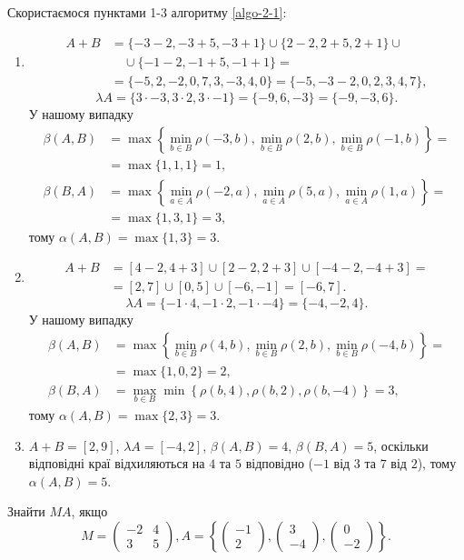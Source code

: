 \begin{solution}
	Скористаємося пунктами 1-3 алгоритму \ref{algo-2-1}:
	\begin{enumerate}
	    \item \begin{align*} A + B &= \{-3-2, -3+5, -3+1\} \cup \{2-2, 2+5, 2+1\} \cup \\
	    &\quad\cup \{-1-2, -1+5, -1+1\} =\\&= \{-5,2,-2,0,7,3,-3,4,0\}=\{-5,-3-2,0,2,3,4,7\},\end{align*}
	    \[ \lambda A = \{3 \cdot -3, 3 \cdot 2, 3 \cdot -1 \} = \{-9,6,-3\}=\{-9,-3,6\}.\]
	    У нашому випадку \begin{align*}\beta (A, B) &= \max\left\{\min_{b\in B} \rho(-3,b), \min_{b\in B} \rho(2,b), \min_{b\in B} \rho(-1,b)\right\}=\\&=\max\{1,1,1\}=1, \\ \beta (B, A) &= \max\left\{\min_{a\in A} \rho(-2,a), \min_{a\in A} \rho(5,a), \min_{a\in A} \rho(1,a)\right\}=\\&=\max\{1,3,1\}=3,\end{align*} тому $\alpha (A, B) = \max\{1,3\}=3$.
	    \item \begin{align*} A + B &= [4-2,4+3] \cup [2-2,2+3] \cup [-4-2,-4+3] = \\
	        &= [2,7] \cup [0,5] \cup [-6,-1] = [-6,7].
	    \end{align*} 
	    \[ \lambda A = \{-1 \cdot 4, -1 \cdot 2, -1 \cdot -4 \} = \{-4,-2,4\}.\]
	    У нашому випадку \begin{align*}\beta (A, B) &= \max\left\{\min_{b\in B} \rho(4,b), \min_{b\in B} \rho(2,b), \min_{b\in B} \rho(-4,b)\right\}= \\ & = \max\{1,0,2\} = 2, \\ \beta (B, A) &= \max_{b\in B} \min \left\{\rho(b,4), \rho(b,2), \rho(b,-4)\right\} = 3,\end{align*} тому $\alpha (A, B) = \max\{2,3\}=3$.
	    \item $A + B = [2,9]$, $\lambda A = [-4,2]$, $\beta (A, B) = 4$, $\beta (B, A) = 5$, оскільки відповідні краї відхиляються на $4$ та $5$ відповідно ($-1$ від $3$ та $7$ від $2$), тому $\alpha (A, B) = 5$.
	\end{enumerate}
\end{solution}

\begin{problem}
	Знайти $MA$, якщо
	\[
	M=
  \begin{pmatrix}
    -2 & 4 \\
    3 & 5
  \end{pmatrix}
  , A= 
  \left\{
  \begin{pmatrix}
    -1 \\
    2 
  \end{pmatrix},
    \begin{pmatrix}
    3 \\
    -4 
  \end{pmatrix},
    \begin{pmatrix}
    0 \\
    -2 
  \end{pmatrix}
  \right\}
  .\]
\end{problem}

